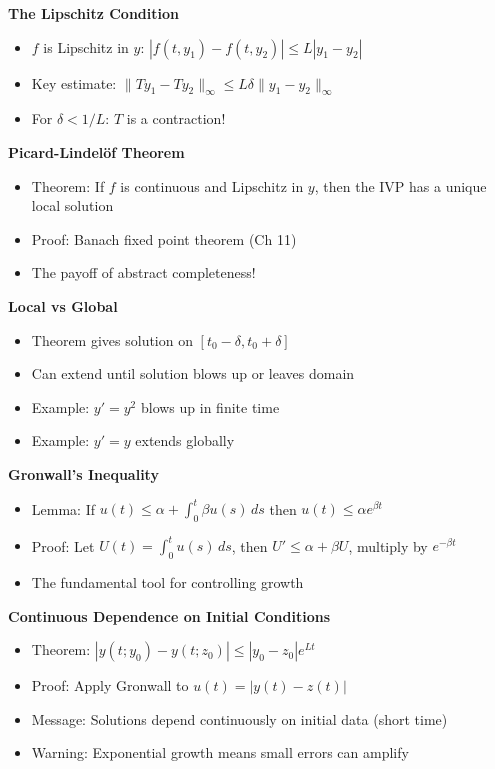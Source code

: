 \documentclass[
  10pt,
  letterpaper,
]{scrbook}
\providecommand{\tightlist}{%
  \setlength{\itemsep}{0pt}\setlength{\parskip}{0pt}}
\begin{document}
\textbf{The Lipschitz Condition}

\begin{itemize}
\tightlist
\item
  \(f\) is Lipschitz in \(y\):
  \(|f(t, y_1) - f(t, y_2)| \leq L|y_1 - y_2|\)
\item
  Key estimate:
  \(\|Ty_1 - Ty_2\|_\infty \leq L\delta \|y_1 - y_2\|_\infty\)
\item
  For \(\delta < 1/L\): \(T\) is a contraction!
\end{itemize}

\textbf{Picard-Lindelöf Theorem}

\begin{itemize}
\tightlist
\item
  Theorem: If \(f\) is continuous and Lipschitz in \(y\), then the IVP
  has a unique local solution
\item
  Proof: Banach fixed point theorem (Ch 11)
\item
  The payoff of abstract completeness!
\end{itemize}

\textbf{Local vs Global}

\begin{itemize}
\tightlist
\item
  Theorem gives solution on \([t_0 - \delta, t_0 + \delta]\)
\item
  Can extend until solution blows up or leaves domain
\item
  Example: \(y' = y^2\) blows up in finite time
\item
  Example: \(y' = y\) extends globally
\end{itemize}

\textbf{Gronwall's Inequality}

\begin{itemize}
\tightlist
\item
  Lemma: If \(u(t) \leq \alpha + \int_0^t \beta u(s)\, ds\) then
  \(u(t) \leq \alpha e^{\beta t}\)
\item
  Proof: Let \(U(t) = \int_0^t u(s)\, ds\), then
  \(U' \leq \alpha + \beta U\), multiply by \(e^{-\beta t}\)
\item
  The fundamental tool for controlling growth
\end{itemize}

\textbf{Continuous Dependence on Initial Conditions}

\begin{itemize}
\tightlist
\item
  Theorem: \(|y(t; y_0) - y(t; z_0)| \leq |y_0 - z_0| e^{Lt}\)
\item
  Proof: Apply Gronwall to \(u(t) = |y(t) - z(t)|\)
\item
  Message: Solutions depend continuously on initial data (short time)
\item
  Warning: Exponential growth means small errors can amplify
\end{itemize}
\end{document}
